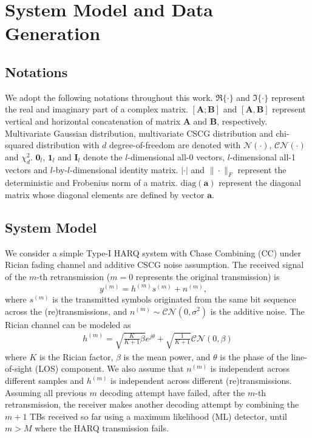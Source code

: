 \documentclass[journal,draftcls,onecolumn,12pt,twoside]{IEEEtran}
\begin{document}
\section{System Model and Data Generation}
\label{sec:model_data}

\subsection{Notations}
\label{subsec:notation}
We adopt the following notations throughout this work. $\Re\{\cdot\}$ and
$\Im\{\cdot\}$ represent the real and imaginary part of a complex matrix.
$[\mathbf{A};\mathbf{B}]$ and $[\mathbf{A},\mathbf{B}]$ represent vertical and
horizontal concatenation of matrix $\mathbf{A}$ and $\mathbf{B}$, respectively. Multivariate Gaussian distribution, 
multivariate CSCG distribution and chi-squared distribution with $d$
degree-of-freedom are denoted with $\mathcal{N}(\cdot)$, $\mathcal{CN}(\cdot)$
and $\chi_d^2$. $\mathbf{0}_l$, $\mathbf{1}_l$ and $\mathbf{I}_l$ denote the
$l$-dimensional all-0 vectors, $l$-dimensional all-1 vectors and
$l$-by-$l$-dimensional identity matrix. $|\cdot|$ and $\|\cdot\|_F$ represent
the deterministic and Frobenius norm of a matrix. $\mbox{diag}(\mathbf{a})$
represent the diagonal matrix whose diagonal elements are defined by vector
$\mathbf{a}$.

\subsection{System Model}
\label{subsec:model}
We consider a simple Type-I HARQ system with Chase Combining (CC) under Rician
fading channel and additive CSCG noise assumption. The received signal of the
$m$-th retransmission ($m=0$ represents the original transmission) is
\begin{equation}
  y^{(m)} = h^{(m)}s^{(m)} + n^{(m)}, \quad
\end{equation}
where $s^{(m)}$ is the transmitted symbols originated from the same bit sequence
across the (re)transmissions, and $n^{(m)}\sim\mathcal{CN}(0,\sigma^2)$ is the
additive noise.
The Rician channel can be modeled as~\cite[(2.55)]{tse2005fundamentals}
\begin{align}
  h^{(m)} = \sqrt{\frac{K}{K+1}\beta}e^{j\theta} +
  \sqrt{\frac{1}{K+1}}\mathcal{CN}(0,\beta)
\end{align}
where $K$ is the Rician factor, $\beta$ is the mean power, and $\theta$ is the
phase of the line-of-sight (LOS) component. We also assume that $n^{(m)}$ is
independent across different samples and $h^{(m)}$ is independent across different
(re)transmissions. Assuming all previous $m$ decoding attempt have failed,
after the $m$-th retransmission, the receiver makes another decoding attempt by
combining the $m + 1$ TBs received so far using a maximum likelihood (ML)
detector, until $m > M$ where the HARQ transmission fails.
\end{document}
